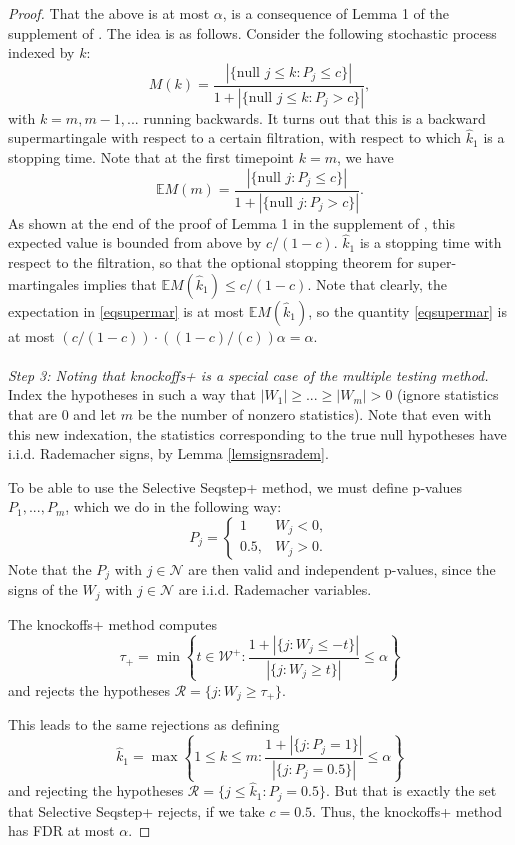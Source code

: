 \documentclass[11pt]{article}
\theoremstyle{plain}
\theoremstyle{definition}
\newcommand{\N}{\mathcal{N}}
\newcommand{\F}{\mathcal{F}}
\newcommand{\R}{\mathcal{R}}
\newcommand{\citt}{\citet}
\begin{document}
\begin{proof}
That the above is at most $\alpha$, is a consequence of Lemma 1 of the supplement of \citt{barber2015controlling}. The idea is as follows. Consider the following stochastic process indexed by $k$:
$$  M(k) =   \frac{|\{\text{null } j\leq k: P_j\leq c  \}| }{1+ |\{\text{null }j\leq k: P_j> c  \}|}, $$
with $k=m, m-1,...$ running backwards. It turns out that this is a backward supermartingale with respect to a certain  filtration, with respect to which $\hat{k}_1$ is a stopping time. %
Note that at the first timepoint $k=m$, we have 
$$
\mathbb{E}M(m) =  \frac{|\{\text{null } j: P_j\leq c  \}| }{1+ |\{\text{null }j: P_j> c  \}|}.
$$
As shown at the end of the proof of Lemma 1 in the supplement of \citt{barber2015controlling}, this expected value is bounded from above by $c/(1-c)$. $\hat{k}_1$ is a stopping time with respect to the filtration, so that the optional stopping theorem for super-martingales  implies that $\mathbb{E}M(\hat{k}_1)\leq c/(1-c)$. Note that clearly, the expectation in \eqref{eqsupermar} is at most  $\mathbb{E}M(\hat{k}_1)$, so  the quantity \eqref{eqsupermar} is at most $(c/(1-c))\cdot ((1-c)/(c))\alpha =\alpha$.
\\
\\
\emph{Step 3: Noting that knockoffs+ is a special case of the  multiple testing method.}
Index the hypotheses  in such  a way that $|W_1|\geq ...\geq |W_m|>0$ (ignore statistics that are 0 and let $m$ be the number of nonzero statistics). Note that even with this new indexation, the statistics corresponding to the true null hypotheses have i.i.d. Rademacher signs, by Lemma \ref{lemsignsradem}.

To be able to use the Selective Seqstep+ method, we must define p-values $P_1,...,P_m$, which we do in the following way:
 \begin{equation}\label{defbinpv}
P_j = 
 \begin{cases}
1 & W_j<0, \\
0.5,  &W_j>0.
\end{cases}
 \end{equation}
 Note that the $P_j$ with $j\in \N$ are then valid and independent p-values, since the signs of the $W_j$ with $j\in \N$ are i.i.d. Rademacher variables.



The knockoffs+ method computes
$$
\tau_+
= \min\left\{
t \in \mathcal{W}^+ :
\frac{1 + |\{j : W_j \le -t\}|}{|\{j : W_j \ge t\}|} \le \alpha
\right\}
$$
and rejects the hypotheses $\R = \{ j : W_j \ge \tau_+ \}$.

This leads to the same rejections as defining 
$$
\hat{k}_1
= \max\left\{
1\leq k \leq m :
\frac{1 + |\{j : P_j=1 \}|}{|\{j : P_j=0.5\}|} \le \alpha
\right\}
$$
and rejecting the hypotheses $\R = \{ j\leq \hat{k}_1  : P_j=0.5\}$.
But that is exactly the set that Selective Seqstep+ rejects, if we take $c=0.5$.
Thus, the knockoffs+ method has FDR at most $\alpha$.

\end{proof}
\end{document}

